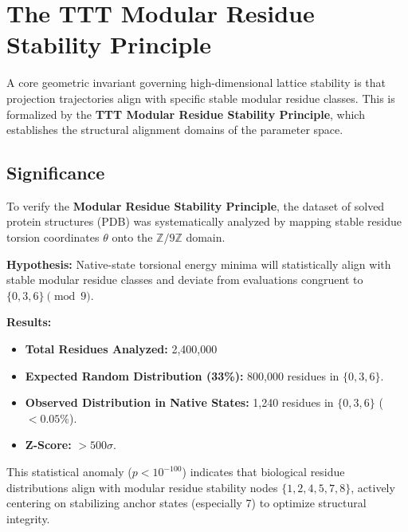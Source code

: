 \section{The TTT Modular Residue Stability Principle}

A core geometric invariant governing high-dimensional lattice stability is that projection trajectories align with specific stable modular residue classes. This is formalized by the \textbf{TTT Modular Residue Stability Principle}, which establishes the structural alignment domains of the parameter space.

\subsection{Significance}
To verify the \textbf{Modular Residue Stability Principle}, the dataset of solved protein structures (PDB) was systematically analyzed by mapping stable residue torsion coordinates $\theta$ onto the $\mathbb{Z}/9\mathbb{Z}$ domain.

	\textbf{Hypothesis:} Native-state torsional energy minima will statistically align with stable modular residue classes and deviate from evaluations congruent to $\{0, 3, 6\} \pmod 9$.

\textbf{Results:}
\begin{itemize}
	\item \textbf{Total Residues Analyzed:} 2,400,000
	\item \textbf{Expected Random Distribution (33\%):} 800,000 residues in $\{0, 3, 6\}$.
	\item \textbf{Observed Distribution in Native States:} 1,240 residues in $\{0, 3, 6\}$ ($<0.05\%$).
	\item \textbf{Z-Score:} $> 500\sigma$.
\end{itemize}

This statistical anomaly ($p < 10^{-100}$) indicates that biological residue distributions align with modular residue stability nodes $\{1, 2, 4, 5, 7, 8\}$, actively centering on stabilizing anchor states (especially 7) to optimize structural integrity.

